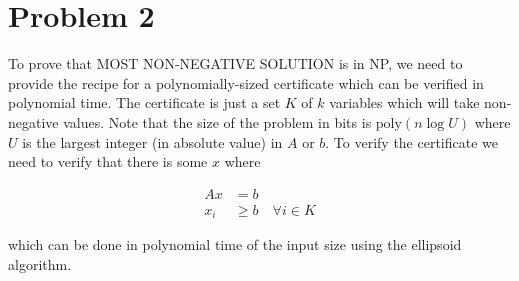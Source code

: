 \section*{Problem 2}

To prove that MOST NON-NEGATIVE SOLUTION is in NP, we need to provide the recipe for a polynomially-sized certificate which can be verified in polynomial time. The certificate is just a set $K$ of $k$ variables which will take non-negative values. Note that the size of the problem in bits is $\text{poly}(n \log U)$ where $U$ is the largest integer (in absolute value) in $A$ or $b$. To verify the certificate we need to verify that there is some $x$ where 

\begin{align*}
Ax &= b\\
x_i &\geq b \quad \forall i \in K
\end{align*}

which can be done in polynomial time of the input size using the ellipsoid algorithm.
